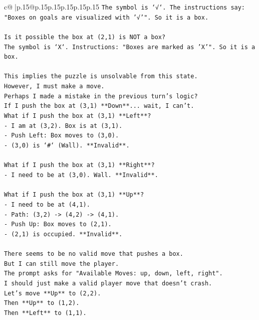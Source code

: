 \documentclass{article}
\begin{document}
{\begin{supertabular}{c@{$\;$}|p{.15\linewidth}@{}p{.15\linewidth}p{.15\linewidth}p{.15\linewidth}p{.15\linewidth}p{.15\linewidth}}
{{{\texttt{The symbol is `√`. The instructions say: "Boxes on goals are visualized with '√'". So it is a box.} \\
\\ 
\texttt{Is it possible the box at (2,1) is NOT a box?} \\
\texttt{The symbol is `X`. Instructions: "Boxes are marked as 'X'". So it is a box.} \\
\\ 
\texttt{This implies the puzzle is unsolvable from this state.} \\
\texttt{However, I must make a move.} \\
\texttt{Perhaps I made a mistake in the previous turn's logic?} \\
\texttt{If I push the box at (3,1) **Down**... wait, I can't.} \\
\texttt{What if I push the box at (3,1) **Left**?} \\
\texttt{{-} I am at (3,2). Box is at (3,1).} \\
\texttt{{-} Push Left: Box moves to (3,0).} \\
\texttt{{-} (3,0) is `\#` (Wall). **Invalid**.} \\
\\ 
\texttt{What if I push the box at (3,1) **Right**?} \\
\texttt{{-} I need to be at (3,0). Wall. **Invalid**.} \\
\\ 
\texttt{What if I push the box at (3,1) **Up**?} \\
\texttt{{-} I need to be at (4,1).} \\
\texttt{{-} Path: (3,2) {-}> (4,2) {-}> (4,1).} \\
\texttt{{-} Push Up: Box moves to (2,1).} \\
\texttt{{-} (2,1) is occupied. **Invalid**.} \\
\\ 
\texttt{There seems to be no valid move that pushes a box.} \\
\texttt{But I can still move the player.} \\
\texttt{The prompt asks for "Available Moves: up, down, left, right".} \\
\texttt{I should just make a valid player move that doesn't crash.} \\
\texttt{Let's move **Up** to (2,2).} \\
\texttt{Then **Up** to (1,2).} \\
\texttt{Then **Left** to (1,1).} \\
}}}
\end{supertabular}}
\end{document}
